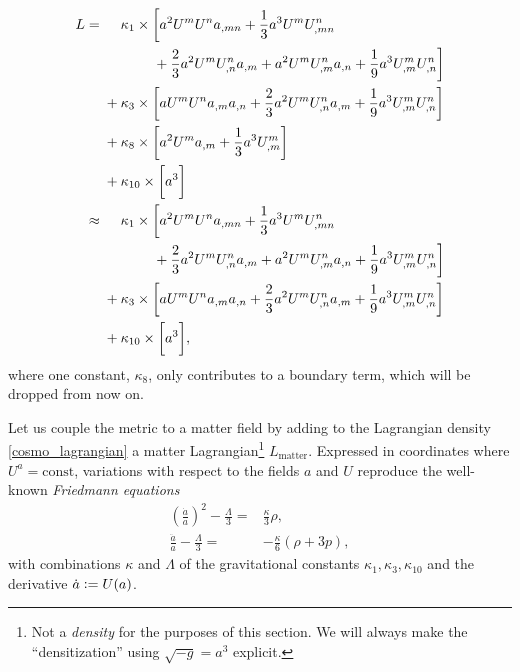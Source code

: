 \begin{equation}\label{cosmo_lagrangian}
  \begin{aligned}
    L = {} & \mathbin{\hphantom{+}} \kappa_1 \times \bigg\lbrack a^2 U^m U^n a_{,mn} + \frac{1}{3} a^3 U^m U^n_{,mn} \\ {} & \hphantom{+ \kappa_1 \times \bigg\lbrack } + \frac{2}{3} a^2 U^m U^n_{,n} a_{,m} + a^2 U^m U^n_{,m} a_{,n} + \frac{1}{9} a^3 U^m_{,m} U^n_{,n} \bigg\rbrack \\
    {} & + \kappa_3 \times \bigg\lbrack a U^m U^n a_{,m} a_{,n} + \frac{2}{3} a^2 U^m U^n_{,n} a_{,m} + \frac{1}{9} a^3 U^m_{,m} U^n_{,n}\bigg\rbrack \\
    {} & + \kappa_8 \times \bigg\lbrack a^2 U^m a_{,m} + \frac{1}{3} a^3 U^m_{,m} \bigg\rbrack \\
    {} & + \kappa_{10} \times \bigg\lbrack a^3 \bigg\rbrack \\
    \approx {} & \mathbin{\hphantom{+}} \kappa_1 \times \bigg\lbrack a^2 U^m U^n a_{,mn} + \frac{1}{3} a^3 U^m U^n_{,mn} \\ {} & \hphantom{+ \kappa_1 \times \bigg\lbrack } + \frac{2}{3} a^2 U^m U^n_{,n} a_{,m} + a^2 U^m U^n_{,m} a_{,n} + \frac{1}{9} a^3 U^m_{,m} U^n_{,n} \bigg\rbrack \\
    {} & + \kappa_3 \times \bigg\lbrack a U^m U^n a_{,m} a_{,n} + \frac{2}{3} a^2 U^m U^n_{,n} a_{,m} + \frac{1}{9} a^3 U^m_{,m} U^n_{,n}\bigg\rbrack \\
    {} & + \kappa_{10} \times \bigg\lbrack a^3 \bigg\rbrack,
  \end{aligned}
\end{equation}
where one constant, $\kappa_8$, only contributes to a boundary term, which will be dropped from now on.

Let us couple the metric to a matter field by adding to the Lagrangian density \eqref{cosmo_lagrangian} a matter Lagrangian\footnote{Not a \emph{density} for the purposes of this section. We will always make the ``densitization'' using $\sqrt{-g} = a^3$ explicit.} $L_\text{matter}$. Expressed in coordinates where $U^a = \text{const}$, variations with respect to the fields $a$ and $U$ reproduce the well-known \emph{Friedmann equations} \cite{Friedman_1922}
\begin{align}
  \left(\frac{\dot a}{a}\right)^2 - \frac{\Lambda}{3} = {} & \frac{\kappa}{3} \rho, \label{friedmann_1}\\
  \frac{\ddot a}{a} - \frac{\Lambda}{3} = {} & -\frac{\kappa}{6}(\rho + 3 p), \label{friedmann_2}
\end{align}
with combinations $\kappa$ and $\Lambda$ of the gravitational constants $\kappa_1,\kappa_3,\kappa_{10}$ and the derivative $\dot a \vcentcolon= U(a)$.


